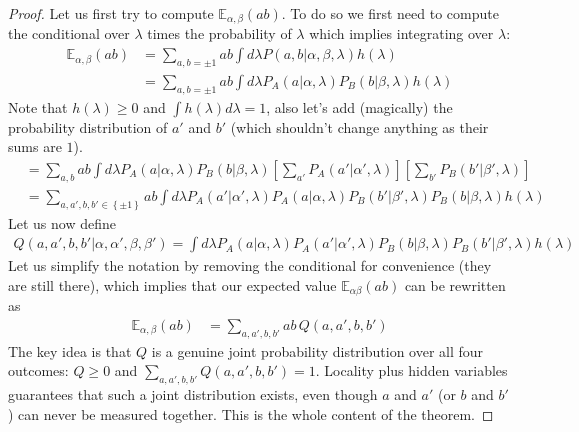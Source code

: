 \begin{proof}
    Let us first try to compute $\mathbb{E}_{\alpha, \beta}\left(ab\right)$. To do so we first need to compute the conditional over $\lambda$ times the probability of $\lambda$ which implies integrating over $\lambda$:
	\begin{align*} 
		\mathbb{E}_{\alpha, \beta}\left(ab\right) &= \sum_{a, b =  \pm 1}ab \int d \lambda P\left(a, b| \alpha, \beta, \lambda\right)h\left(\lambda\right) \\
												  &= \sum_{a, b = \pm 1} ab \int d \lambda P_A\left(a | \alpha, \lambda\right) P_B\left(b | \beta, \lambda\right)h\left(\lambda\right)
	\end{align*}
	Note that $h\left(\lambda\right) \geq 0$ and $\int h\left(\lambda\right)d \lambda = 1$, also let's add (magically) the probability distribution of $a'$ and $b'$ (which shouldn't change anything as their sums are $1$).
	\begin{align*} 
		&=  \sum_{a, b} ab \int d \lambda P_A\left(a| \alpha, \lambda\right) P_B\left(b| \beta, \lambda\right) \left[\sum_{a'}P_A\left(a'|\alpha', \lambda\right)\right] \left[\sum_{b'}P_B\left(b'| \beta', \lambda\right)\right]\\
		&= \sum_{a, a', b, b' \in \left\{\pm 1\right\}} ab \int d \lambda P_A\left(a' | \alpha', \lambda\right) P_A\left(a | \alpha,  \lambda\right)P_B \left(b' | \beta', \lambda\right) P_B\left(b | \beta, \lambda\right) h\left(\lambda\right)
	\end{align*}
	Let us now define 
	\begin{align*} 
		Q\left(a, a', b, b'| \alpha, \alpha', \beta, \beta'\right) = \int d \lambda P_A\left(a| \alpha, \lambda\right) P_A\left(a'|\alpha', \lambda\right) P_B \left(b| \beta, \lambda\right) P_B\left(b'| \beta', \lambda\right) h\left(\lambda\right) 
	\end{align*}
	Let us simplify the notation by removing the conditional for convenience (they are still there), which implies that our expected value $\mathbb{E}_{\alpha \beta}\left(ab\right)$ can be rewritten as 
	\begin{align*} 
		\mathbb{E}_{\alpha, \beta}\left(ab\right) &=  \sum_{a, a', b, b'} ab\, Q\left(a, a', b, b'\right)
	\end{align*}
	The key idea is that $Q$ is a genuine joint probability distribution over all four outcomes: $Q \geq 0$ and $\sum_{a, a', b, b'} Q\left(a, a', b, b'\right) = 1$. Locality plus hidden variables guarantees that such a joint distribution exists, even though $a$ and $a'$ (or $b$ and $b'$) can never be measured together. This is the whole content of the theorem.

\end{proof}
